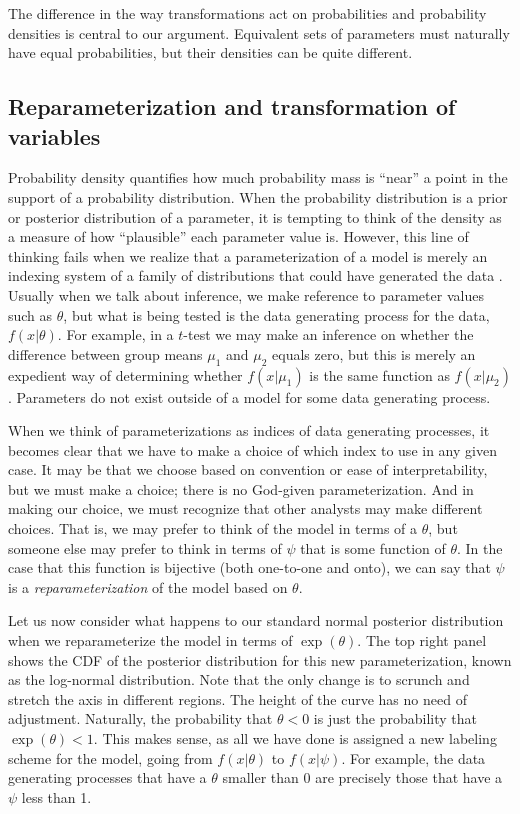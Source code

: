 \documentclass[9pt,twocolumn,twoside]{cidlab-draft}\templatetype{cidlab-invited}
\begin{document}
The difference in the way transformations act on probabilities and probability densities is central to our argument. Equivalent sets of parameters must naturally have equal probabilities, but their densities can be quite different.

\subsection*{Reparameterization and transformation of variables}
Probability density quantifies how much probability mass is ``near'' a point in the support of a probability distribution. When the probability distribution is a prior or posterior distribution of a parameter, it is tempting to think of the density as a measure of how ``plausible'' each parameter value is. However, this line of thinking fails when we realize that a parameterization of a model is merely an indexing system of a family of distributions that could have generated the data \cite{bernardo2005}. Usually when we talk about inference, we make reference to parameter values such as $\theta$, but what is being tested is the data generating process for the data, $f(x|\theta)$. For example, in a $t$-test we may make an inference on whether the difference between group means $\mu_1$ and $\mu_2$ equals zero, but this is merely an expedient way of determining whether $f(x|\mu_1)$ is the same function as $f(x|\mu_2)$. Parameters do not exist outside of a model for some data generating process. 

When we think of parameterizations as indices of data generating processes, it becomes clear that we have to make a choice of which index to use in any given case. It may be that we choose based on convention or ease of interpretability, but we must make a choice; there is no God-given parameterization. And in making our choice, we must recognize that other analysts may make different choices. That is, we may prefer to think of the model in terms of a $\theta$, but someone else may prefer to think in terms of $\psi$ that is some function of $\theta$.  In the case that this function is bijective (both one-to-one and onto), we can say that $\psi$ is a \textit{reparameterization} of the model based on $\theta$. 

Let us now consider what happens to our standard normal posterior distribution when we reparameterize the model in terms of $\exp{(\theta)}$.  The top right panel shows the CDF of the posterior distribution for this new parameterization, known as the log-normal distribution. Note that the only change is to scrunch and stretch the axis in different regions.  The height of the curve has no need of adjustment. Naturally, the probability that $\theta<0$ is just the probability that $\exp{(\theta)}<1$. This makes sense, as all we have done is assigned a new labeling scheme for the model, going from $f(x|\theta)$ to $f(x|\psi)$.  For example, the data generating processes that have a $\theta$ smaller than 0 are precisely those that have a $\psi$ less than 1. 
 
\end{document}
